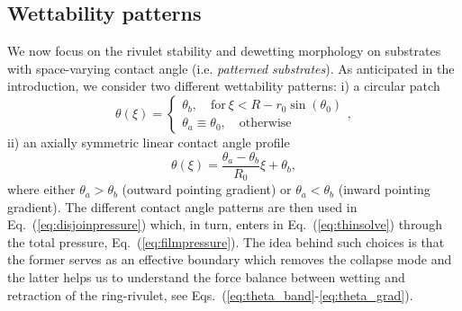 \documentclass[twoside,twocolumn,9pt]{article}
\begin{document}
\subsection{Wettability patterns}\label{subsec:wettability}

We now focus on the rivulet stability and dewetting morphology on 
substrates with space-varying contact angle (i.e. {\it patterned substrates}).
As anticipated in the introduction, we consider two different wettability patterns: i) a  circular patch 
\begin{equation}\label{eq:theta_band}
    \theta(\xi) =\begin{cases}
        \theta_b,\quad \text{for}~\xi < R - r_0\sin(\theta_0) \\
        \theta_a \equiv \theta_0,\quad \text{otherwise}
    \end{cases},
\end{equation}
ii) an axially symmetric linear contact angle profile
\begin{equation}\label{eq:theta_grad}
    \theta(\xi) = \frac{\theta_{a}-\theta_{b}}{R_0} \xi + \theta_{b},
\end{equation}
where either $\theta_{a} > \theta_{b}$ (outward pointing gradient) or $\theta_a < \theta_b$ (inward pointing
 gradient).
The different contact angle patterns are then used in Eq.~(\ref{eq:disjoinpressure}) which, in turn, enters in Eq.~(\ref{eq:thinsolve}) through the total pressure, Eq.~(\ref{eq:filmpressure}).
The idea behind such choices is that the former serves as an effective boundary which removes the collapse mode and the latter helps us to understand the force balance between wetting and retraction of the ring-rivulet, see Eqs.~(\ref{eq:theta_band}-\ref{eq:theta_grad}).
\end{document}
